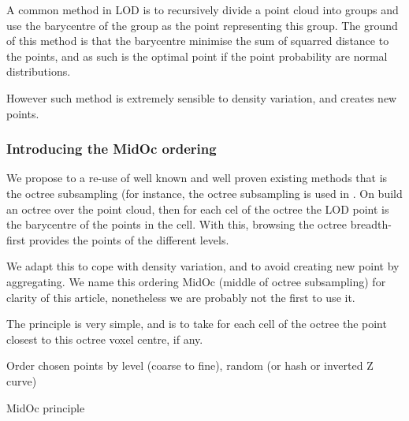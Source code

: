 		A common method in LOD is to recursively divide a point cloud into groups and use the barycentre of the group as the point representing this group. The ground of this method is that the barycentre minimise the sum of squarred distance to the points, and as such is the optimal point if the point probability are normal distributions.
		
		However such method is extremely sensible to density variation, and creates new points. 
		
		\subsubsection{Introducing the MidOc ordering}
		
		We propose to a re-use of well known and well proven existing methods that is the octree subsampling (for instance, the octree subsampling is used in \cite{Girardeau-Montaut2014}.
		On build an octree over the point cloud, then for each cel of the octree the LOD point is the barycentre of the points in the cell.  With this, browsing the octree breadth-first provides the points of the different levels.
		
		We adapt this to cope with density variation, and to avoid creating new point by aggregating.   
		We name this ordering MidOc (middle of octree subsampling) for clarity of this article, nonetheless we are probably not the first to use it.
		
		
		The principle is very simple, and is to take for each cell of the octree the point closest to this octree voxel centre, if any.
		\begin{algorithm}
			
			Order chosen points by level (coarse to fine), random (or hash or inverted Z curve)\;
			\caption{MidOc principle}
		\end{algorithm} 
			 
